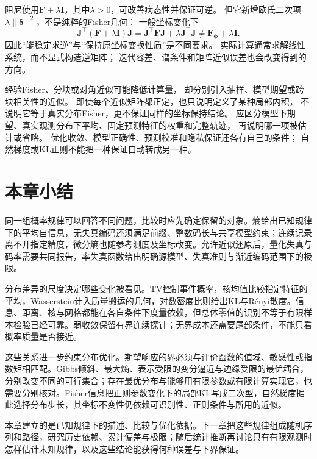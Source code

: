 阻尼使用\(\bm F+\lambda\bm I\)，其中\(\lambda>0\)，可改善病态性并保证可逆。
但它新增欧氏二次项\(\lambda\|\bm\delta\|^2\)，不是纯粹的Fisher几何：
一般坐标变化下
\[
  \bm J^\top(\bm F+\lambda\bm I)\bm J
  =\bm J^\top\bm F\bm J+\lambda\bm J^\top\bm J
  \neq\bm F_{\bm\phi}+\lambda\bm I.
\]
因此“能稳定求逆”与“保持原坐标变换性质”是不同要求。
实际计算通常求解线性系统，而不显式构造逆矩阵；
迭代容差、谱条件和矩阵近似误差也会改变得到的方向。

经验Fisher、分块或对角近似可能降低计算量，
却分别引入抽样、模型期望或跨块相关性的近似。
即使每个近似矩阵都正定，也只说明定义了某种局部内积，
不说明它等于真实分布Fisher，更不保证同样的坐标保持结论。
应区分模型下期望、真实观测分布下平均、固定预测特征的权重和完整轨迹，
再说明哪一项被估计或省略。
优化收敛、模型正确性、预测校准和隐私保证还各有自己的条件；
自然梯度或KL正则不能把一种保证自动转成另一种。

\section{本章小结}
\label{sec:information-theory-statistical-geometry-summary}

同一组概率规律可以回答不同问题，比较时应先确定保留的对象。熵给出已知规律下的平均自信息，无失真编码还须满足前缀、整数码长与共享模型约束；连续记录离不开指定精度，微分熵也随参考测度及坐标改变。允许近似还原后，量化失真与码率需要共同报告，率失真函数给出明确源模型、失真准则与渐近编码范围下的极限。

分布差异的尺度决定哪些变化被看见。TV控制事件概率，核均值比较指定特征的平均，Wasserstein计入质量搬运的几何，对数密度比则给出KL与R\'enyi散度。信息、距离、核与网格都能在各自条件下度量依赖，但总体零值的识别不等于有限样本检验已经可靠。弱收敛保留有界连续探针；无界成本还需要尾部条件，不能只看概率质量是否接近。

这些关系进一步约束分布优化。期望响应的界必须与评价函数的值域、敏感性或指数矩相匹配。Gibbs倾斜、最大熵、表示受限的变分逼近与边缘受限的最优耦合，分别改变不同的可行集合；存在最优分布与能够用有限参数或有限计算实现它，也需要分别核对。Fisher信息把正则参数变化下的局部KL写成二次型，自然梯度据此选择分布步长，其坐标不变性仍依赖可识别性、正则条件与所用的近似。

本章建立的是已知规律下的描述、比较与优化依据。下一章把这些规律组成随机序列和路径，研究历史依赖、累计偏差与极限；随后统计推断再讨论只有有限观测时怎样估计未知规律，以及这些结论能获得何种误差与下界保证。
